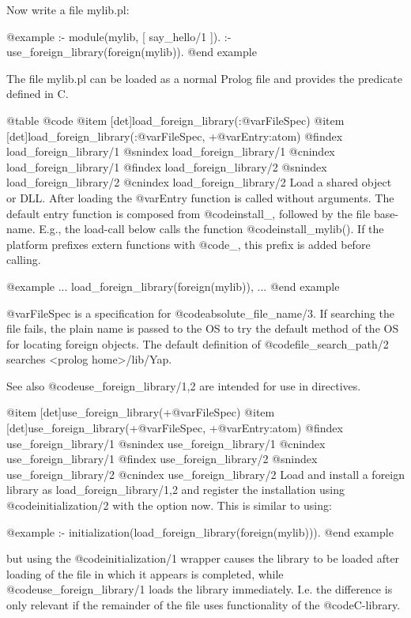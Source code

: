 {{{{{{{{Now write a file mylib.pl:

@example
:- module(mylib, [ say_hello/1 ]).
:- use_foreign_library(foreign(mylib)).
@end example

The file mylib.pl can be loaded as a normal Prolog file and provides the predicate defined in C.

@table @code
@item [det]load_foreign_library(:@var{FileSpec})
@item [det]load_foreign_library(:@var{FileSpec}, +@var{Entry}:atom)
@findex load_foreign_library/1
@snindex load_foreign_library/1
@cnindex load_foreign_library/1
@findex load_foreign_library/2
@snindex load_foreign_library/2
@cnindex load_foreign_library/2
    Load a shared object or DLL. After loading the @var{Entry} function is
    called without arguments. The default entry function is composed
    from @code{install_}, followed by the file base-name. E.g., the
    load-call below calls the function @code{install_mylib()}. If the platform
    prefixes extern functions with @code{_}, this prefix is added before
    calling.

@example
          ...
          load_foreign_library(foreign(mylib)),
          ...
@end example

    @var{FileSpec} is a specification for
    @code{absolute_file_name/3}. If searching the file fails, the plain
    name is passed to the OS to try the default method of the OS for
    locating foreign objects. The default definition of
    @code{file_search_path/2} searches <prolog home>/lib/Yap.

    See also
        @code{use_foreign_library/1,2} are intended for use in
        directives. 

@item [det]use_foreign_library(+@var{FileSpec})
@item [det]use_foreign_library(+@var{FileSpec}, +@var{Entry}:atom)
@findex use_foreign_library/1
@snindex use_foreign_library/1
@cnindex use_foreign_library/1
@findex use_foreign_library/2
@snindex use_foreign_library/2
@cnindex use_foreign_library/2
    Load and install a foreign library as load_foreign_library/1,2 and
    register the installation using @code{initialization/2} with the option
    now. This is similar to using:

@example
    :- initialization(load_foreign_library(foreign(mylib))).
@end example

    but using the @code{initialization/1} wrapper causes the library to
    be loaded after loading of the file in which it appears is
    completed, while @code{use_foreign_library/1} loads the library
    immediately. I.e. the difference is only relevant if the remainder
    of the file uses functionality of the @code{C}-library. 

}}}}}}}}
